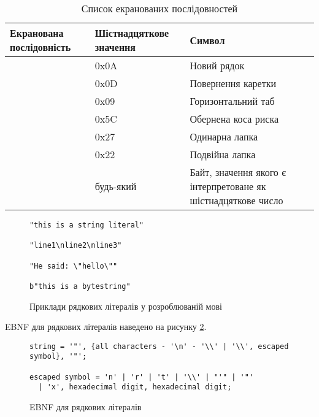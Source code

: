 \documentclass[main.tex]{subfiles}
\begin{document}
\begin{table}
  \tabulinesep=1mm
  \caption{Список екранованих послідовностей}
  \begin{tabu}{|l|l|X[l]|}
    \hline
    Екранована послідовність & Шістнадцяткове значення & Символ \\
    \hline
     & 0x0A & Новий рядок \\
    \hline
     & 0x0D & Повернення каретки \\
    \hline
     & 0x09 & Горизонтальний таб \\
    \hline
    \code{\textbackslash{}\textbackslash{}} & 0x5C & Обернена коса риска \\
    \hline
     & 0x27 & Одинарна лапка \\
    \hline
     & 0x22 & Подвійна лапка \\
    \hline
     & будь-який & Байт, значення якого є  інтерпретоване як шістнадцяткове число \\
    \hline
  \end{tabu}
  \label{lang:escape-sequences}
\end{table}

\begin{figure}[h]
  \centering
  \begin{verbatim}
"this is a string literal"

"line1\nline2\nline3"

"He said: \"hello\""

b"this is a bytestring"
  \end{verbatim}
  \caption{Приклади рядкових літералів у розроблюваній мові}
  \label{lang:literals:strings}
\end{figure}

EBNF для рядкових літералів наведено на рисунку \ref{ebnf:string-literals}.

\begin{figure}[h]
  \centering
  \begin{verbatim}
string = '"', {all characters - '\n' - '\\' | '\\', escaped symbol}, '"';

escaped symbol = 'n' | 'r' | 't' | '\\' | "'" | '"'
  | 'x', hexadecimal digit, hexadecimal digit;
  \end{verbatim}
  \caption{EBNF для рядкових літералів}
  \label{ebnf:string-literals}
\end{figure}
\end{document}
